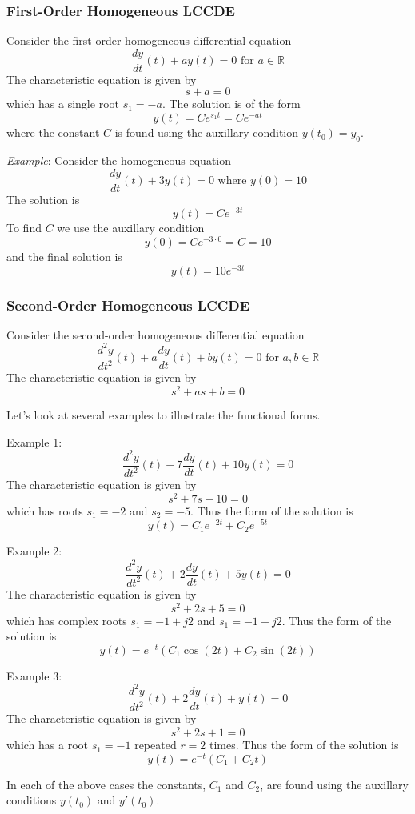 \subsubsection*{First-Order Homogeneous LCCDE}

Consider the first order homogeneous differential equation
\[
\frac{dy}{dt}(t) + ay(t) = 0 \mbox{ for } a \in \mathbb{R}
\]
The characteristic equation is given by
\[
s + a = 0
\]
which has a single root $s_1 = -a$. The solution is of the form
\[
y(t) = Ce^{s_1 t} = Ce^{-a t} 
\]
where the constant $C$ is found using the auxillary condition $y(t_0) = y_0$.

\textit{Example}: Consider the homogeneous equation
\[
\frac{dy}{dt}(t) + 3y(t) = 0 \mbox{ where } y(0) = 10
\]
The solution is
\[
y(t) = Ce^{-3 t} 
\]
To find $C$ we use the auxillary condition
\[
y(0) = Ce^{-3 \cdot 0} = C = 10
\]
and the final solution is
\[
y(t) = 10e^{-3 t} 
\]
\subsubsection*{Second-Order Homogeneous LCCDE}

Consider the second-order homogeneous differential equation
\[
\frac{d^2y}{dt^2}(t) + a\frac{dy}{dt}(t) + by(t) = 0 \mbox{ for } a,b \in \mathbb{R}
\]
The characteristic equation is given by
\[
s^2 + as + b = 0
\]

Let's look at several examples to illustrate the functional forms.

Example 1:
\[
\frac{d^2y}{dt^2}(t) + 7\frac{dy}{dt}(t) + 10y(t) = 0 
\]
The characteristic equation is given by
\[
s^2 + 7s + 10 = 0
\]
which has roots $s_1 = -2$ and $s_2 = -5$. Thus the form of the solution is
\[
y(t) = C_1e^{-2t} + C_2e^{-5t}
\]

Example 2:
\[
\frac{d^2y}{dt^2}(t) + 2\frac{dy}{dt}(t) + 5y(t) = 0 
\]
The characteristic equation is given by
\[
s^2 + 2s + 5 = 0
\]
which has complex roots $s_1 = -1+j2$ and $s_1 = -1-j2$. Thus the form of the solution is
\[
y(t) = e^{-t}\left(C_1\cos(2t) + C_2\sin(2t)\right)
\]

Example 3:
\[
\frac{d^2y}{dt^2}(t) + 2\frac{dy}{dt}(t) + y(t) = 0 
\]
The characteristic equation is given by
\[
s^2 + 2s + 1 = 0
\]
which has a root $s_1 = -1$ repeated $r=2$ times. Thus the form of the solution is
\[
y(t) = e^{-t}\left(C_1 + C_2t\right)
\]

In each of the above cases the constants, $C_1$ and $C_2$, are found using the auxillary conditions $y(t_0)$ and $y\prime(t_0)$.

